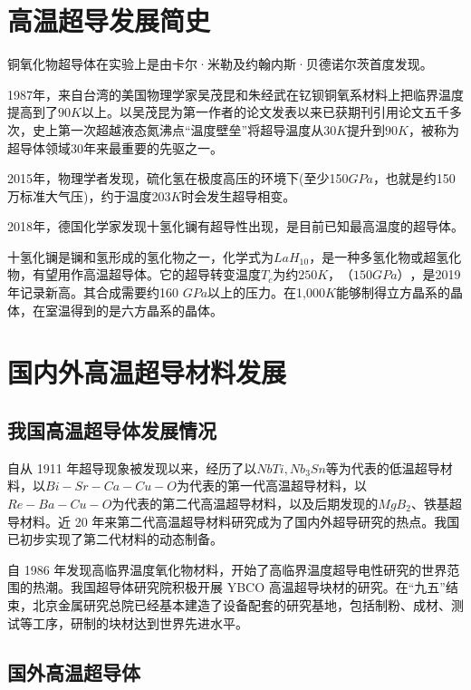 \documentclass[UTF8, twocolumn]{ctexart}
\begin{document}
\section{高温超导发展简史}

    铜氧化物超导体在实验上是由卡尔·米勒及约翰内斯·贝德诺尔茨首度发现。

    1987年，来自台湾的美国物理学家吴茂昆和朱经武在钇钡铜氧系材料上把临界温度提高到了$90K$以上。以吴茂昆为第一作者的论文\cite{PhysRevLett.58.908}发表以来已获期刊引用论文五千多次，史上第一次超越液态氮沸点“温度壁垒”将超导温度从$30K$提升到$90K$，被称为超导体领域30年来最重要的先驱之一。

    2015年，物理学者发现，硫化氢在极度高压的环境下(至少150$GPa$，也就是约150万标准大气压)，约于温度203$K$时会发生超导相变\cite{drozdov2015conventional}。

    2018年，德国化学家发现十氢化镧有超导性出现，是目前已知最高温度的超导体。

    十氢化镧是镧和氢形成的氢化物之一，化学式为$LaH_{10}$，是一种多氢化物或超氢化物，有望用作高温超导体。它的超导转变温度$T_c$为约$250 K$，$（150 GPa）$，是2019年记录新高。其合成需要约160 $GPa$以上的压力。在1,000$ K$能够制得立方晶系的晶体，在室温得到的是六方晶系的晶体\cite{drozdov2019superconductivity}。

\section{国内外高温超导材料发展}
    
    \subsection{我国高温超导体发展情况}

    自从 1911 年超导现象被发现以来，经历了以$NbTi,Nb_3 Sn$等为代表的低温超导材料，以$Bi-Sr-Ca-Cu-O$为代表的第一代高温超导材料，以$Re-Ba-Cu-O$为代表的第二代高温超导材料，以及后期发现的$MgB_2$、铁基超导材料\cite{金之俭2018二代高温超导材料的应用技术与发展综述}。近 20 年来第二代高温超导材料研究成为了国内外超导研究的热点。我国已初步实现了第二代材料的动态制备\cite{杨天信2008我国高温超导技术研究现状}。

    自 1986 年发现高临界温度氧化物材料，开始了高临界温度超导电性研究的世界范围的热潮。我国超导体研究院积极开展 YBCO 高温超导块材的研究。在“九五”结束，北京金属研究总院已经基本建造了设备配套的研究基地，包括制粉、成材、测试等工序，研制的块材达到世界先进水平\cite{林良真2005我国超导技术研究进展及展望}。

    \subsection{国外高温超导体}
\end{document}
